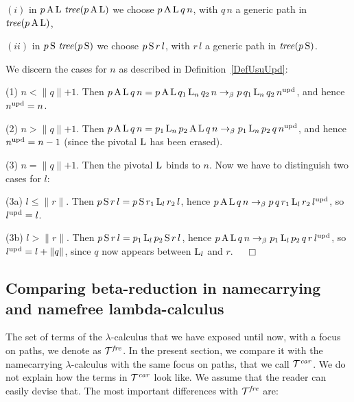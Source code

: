 \documentclass[submission,copyright,creativecommons]{eptcs}
\begin{document}
$(i)$ in $p \, {\rm A} \, {\rm L} \, \, {\it tree}(p \, {\rm A} \, {\rm L})$ we choose $p \, {\rm A} \, {\rm L} \, q \, n$, with $q \, n$ a generic path in ${\it tree}(p \, {\rm A} \, {\rm L})$,

$(ii)$ in $p \, {\rm S} \, \, {\it tree}(p \, {\rm S})$ we choose $p \, {\rm S} \, r \, l$, with $r \, l$ a generic path in ${\it tree}(p \, {\rm S})$.

\smallskip

We discern the cases for $n$ as described in Definition~\ref{DefUsuUpd}:

(1) $n < \lVert q \lVert + 1$.
Then $p \, {\rm A} \, {\rm L} \, q \, n = p \, {\rm A} \, {\rm L} \, q_1 \, {\rm L}_n \, q_2 \, n \rightarrow_{\beta} p \, q_1 \, {\rm L}_n \, q_2 \, n^{\rm upd}$, and hence $n^{\rm upd} = n$.

(2) $n > \lVert q \lVert + 1$.
Then $p \, {\rm A} \, {\rm L} \, q \, n = p_1 \, {\rm L}_n \, p_2 \, {\rm A} \, {\rm L} \, q \, n \rightarrow_{\beta} p_1 \, {\rm L}_n \, p_2 \, q \, n^{\rm upd}$, and hence $n^{\rm upd} = n -1$ (since the pivotal ${\rm L}$ has been erased).

(3) $n = \lVert q \lVert + 1$.
Then the pivotal ${\rm L}$ binds to $n$. Now we have to distinguish two cases for $l$:

(3a) $l \leq \lVert r \lVert$.
Then $p \, {\rm S} \, r \, l = p \, {\rm S} \, r_1 \, {\rm L}_l \, r_2 \, l$, hence $p \, {\rm A} \, {\rm L} \, q \, n \rightarrow_{\beta} p \, q \, r_1 \, {\rm L}_l \, r_2 \, l^{\rm upd}$, so $l^{\rm upd} = l$.

(3b) $l > \lVert r \lVert$.
Then $p \, {\rm S} \, r \, l = p_1 \, {\rm L}_l \, p_2 \, {\rm S} \, r \, l$, hence $p \, {\rm A} \, {\rm L} \, q \, n \rightarrow_{\beta} p_1 \, {\rm L}_l \, p_2 \, q \, r \, l^{\rm upd}$, so $l^{\rm upd} = l + \lVert q \lVert$, since $q$ now appears between ${\rm L}_l$ and $r$. ~~$\Box$





\subsection{Comparing beta-reduction in namecarrying and namefree lambda-calculus}\label{SecCom}



The set of terms of the $\lambda$-calculus that we have exposed until now, with a focus on paths, we denote as ${\cal T}^{\it fre}$. In the present section, we compare it with the namecarrying $\lambda$-calculus with the same focus on paths, that we call ${\cal T}^{\it car}$. We do not explain how the terms in ${\cal T}^{\it car}$ look like. We assume that the reader can easily devise that. The most important differences with ${\cal T}^{\it fre}$ are:
\end{document}
